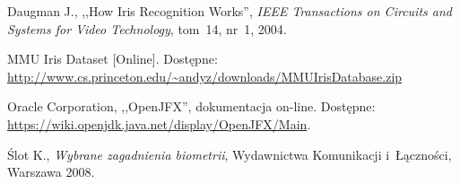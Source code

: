 \documentclass[11pt,a4paper]{article}
\begin{document}
\begin{thebibliography}{9}

        Daugman J.,
        ,,How Iris Recognition Works'',
        \emph{IEEE Transactions on Circuits and Systems for Video Technology},
        tom~14,
        nr~1,
        2004.
        
        MMU Iris Dataset
        [Online].
        Dostępne: \url{http://www.cs.princeton.edu/~andyz/downloads/MMUIrisDatabase.zip}

        Oracle Corporation,
        ,,OpenJFX'',
        dokumentacja on-line.
        Dostępne: \url{https://wiki.openjdk.java.net/display/OpenJFX/Main}.

        Ślot K.,
        \emph{Wybrane zagadnienia biometrii},
        Wydawnictwa Komunikacji i~Łączności,
        Warszawa 2008.

\end{thebibliography}
\end{document}
